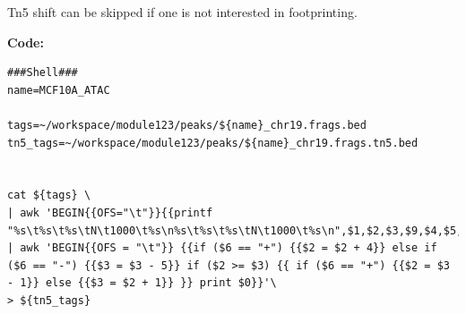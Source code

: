 \documentclass[
]{book}
\begin{document}
Tn5 shift can be skipped if one is not interested in footprinting.

\textbf{Code:}

\begin{verbatim}
###Shell###
name=MCF10A_ATAC

tags=~/workspace/module123/peaks/${name}_chr19.frags.bed
tn5_tags=~/workspace/module123/peaks/${name}_chr19.frags.tn5.bed


cat ${tags} \
| awk 'BEGIN{{OFS="\t"}}{{printf "%s\t%s\t%s\tN\t1000\t%s\n%s\t%s\t%s\tN\t1000\t%s\n",$1,$2,$3,$9,$4,$5,$6,$10}}'\
| awk 'BEGIN{{OFS = "\t"}} {{if ($6 == "+") {{$2 = $2 + 4}} else if ($6 == "-") {{$3 = $3 - 5}} if ($2 >= $3) {{ if ($6 == "+") {{$2 = $3 - 1}} else {{$3 = $2 + 1}} }} print $0}}'\
> ${tn5_tags}
\end{verbatim}
\end{document}
